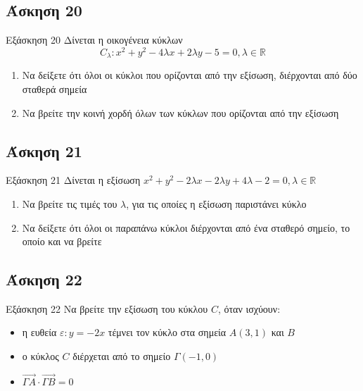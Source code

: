 \documentclass[greek]{beamer}
\begin{document}
\subsection{Άσκηση 20}
\begin{frame}[label=Άσκηση20,t]{Εξάσκηση 20}
  Δίνεται η οικογένεια κύκλων
  $$C_λ:x^2+y^2-4λx+2λy-5=0,λ\in\mathbb{R}$$
  \begin{enumerate}
    \item<1-> Να δείξετε ότι όλοι οι κύκλοι που ορίζονται από την εξίσωση, διέρχονται από δύο σταθερά σημεία
    \item<2-> Να βρείτε την κοινή χορδή όλων των κύκλων που ορίζονται από την εξίσωση
  \end{enumerate}

\end{frame}

\subsection{Άσκηση 21}
\begin{frame}[label=Άσκηση21,t]{Εξάσκηση 21}
  Δίνεται η εξίσωση $x^2+y^2-2λx-2λy+4λ-2=0,λ\in\mathbb{R}$
  \begin{enumerate}
    \item<1-> Να βρείτε τις τιμές του $λ$, για τις οποίες η εξίσωση παριστάνει κύκλο
    \item<2-> Να δείξετε ότι όλοι οι παραπάνω κύκλοι διέρχονται από ένα σταθερό σημείο, το οποίο και να βρείτε
  \end{enumerate}

\end{frame}

\subsection{Άσκηση 22}
\begin{frame}[label=Άσκηση22,t]{Εξάσκηση 22}
  Να βρείτε την εξίσωση του κύκλου $C$, όταν ισχύουν:
  \begin{itemize}
    \item η ευθεία $ε:y=-2x$ τέμνει τον κύκλο στα σημεία $Α(3,1)$ και $Β$
    \item ο κύκλος $C$ διέρχεται από το σημείο $Γ(-1,0)$
    \item $\overrightarrow{ΓΑ}\cdot\overrightarrow{ΓΒ}=0$
  \end{itemize}

\end{frame}
\end{document}
